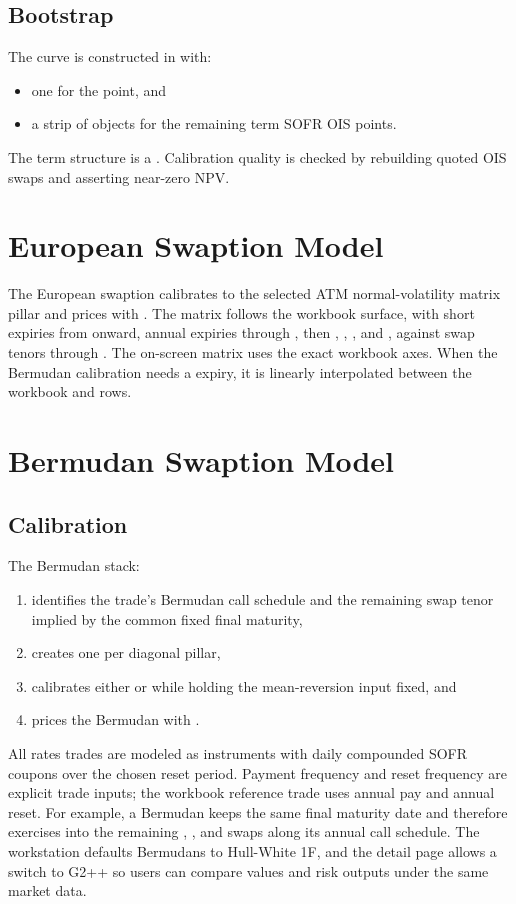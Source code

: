 \documentclass[conference]{IEEEtran}
\begin{document}
\subsection{Bootstrap}
The curve is constructed in  with:
\begin{itemize}[leftmargin=1.5em]
    \item one  for the  point, and
    \item a strip of  objects for the remaining term SOFR OIS points.
\end{itemize}
The term structure is a . Calibration quality is checked by rebuilding quoted OIS swaps and asserting near-zero NPV.

\section{European Swaption Model}
The European swaption calibrates  to the selected ATM normal-volatility matrix pillar and prices with . The matrix follows the workbook surface, with short expiries from  onward, annual expiries through , then , , , and , against swap tenors through . The on-screen matrix uses the exact workbook axes. When the Bermudan calibration needs a  expiry, it is linearly interpolated between the workbook  and  rows.

\section{Bermudan Swaption Model}
\subsection{Calibration}
The Bermudan stack:
\begin{enumerate}[leftmargin=1.5em]
    \item identifies the trade's Bermudan call schedule and the remaining swap tenor implied by the common fixed final maturity,
    \item creates one  per diagonal pillar,
    \item calibrates either  or  while holding the mean-reversion input fixed, and
    \item prices the Bermudan with .
\end{enumerate}
All rates trades are modeled as  instruments with daily compounded SOFR coupons over the chosen reset period. Payment frequency and reset frequency are explicit trade inputs; the workbook reference trade uses annual pay and annual reset.
For example, a  Bermudan keeps the same final maturity date and therefore exercises into the remaining , , and  swaps along its annual call schedule.
The workstation defaults Bermudans to Hull-White 1F, and the detail page allows a switch to G2++ so users can compare values and risk outputs under the same market data.
\end{document}
